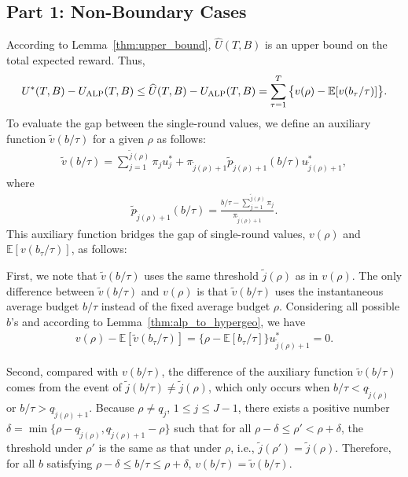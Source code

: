 \subsection{Part 1: Non-Boundary Cases}\label{app:proof_alp_regret_non_boundary}
According to Lemma~\ref{thm:upper_bound}, $\widehat{U}(T,B)$ is an upper bound on the total expected reward. Thus,
\begin{eqnarray} \label{eq:alp_regret}
U^*(T,B) - U_{\rm ALP}(T,B)
\leq  \widehat{U}(T,B) - U_{\rm ALP}(T,B) =  \sum_{\tau = 1}^T \big\{{v}(\rho)-\mathbb{E}[{v}(b_\tau/\tau)]\big\}.
\end{eqnarray}
To evaluate the gap between the single-round values, we define an auxiliary function $\tilde{v}(b/\tau)$ for a given $\rho$ as follows:
\begin{eqnarray}\label{eq:approx_single_round_alp}
\tilde{v}(b/\tau) = \sum_{j = 1}^{\tilde{j}(\rho) }\pi_j u_j^*
 +\pi_{\tilde{j}(\rho) + 1} \tilde{p}_{\tilde{j}(\rho) + 1}(b/\tau) u_{\tilde{j}(\rho) + 1}^*,
\end{eqnarray}
where
\begin{eqnarray}
\tilde{p}_{\tilde{j}(\rho) + 1}(b/\tau) = \frac{b/\tau - \sum_{j = 1}^{\tilde{j}(\rho)} \pi_j} {\pi_{\tilde{j}(\rho) +1}}. \nonumber
\end{eqnarray}
This auxiliary function bridges the gap of single-round values, $v(\rho)$ and $\mathbb{E}[v(b_\tau/\tau)]$, as follows:

First, we note that $\tilde{v}(b/\tau)$ uses the same threshold $\tilde{j}(\rho)$ as in $v(\rho)$.
The only difference between $\tilde{v}(b/\tau)$ and $v(\rho)$ is that $\tilde{v}(b/\tau)$ uses the instantaneous
average budget $b/\tau$ instead of the fixed average budget $\rho$. Considering all possible $b$'s and according to Lemma~\ref{thm:alp_to_hypergeo},
we have
\begin{eqnarray}\label{eq:virtual_and_upperbound}
{v}(\rho) - \mathbb{E}[{\tilde{v}}(b_{\tau}/\tau)] = \big\{\rho - \mathbb{E}[b_{\tau}/\tau]\big\}u_{\tilde{j}(\rho) + 1}^* = 0.
\end{eqnarray}

Second, compared with $v(b/\tau)$, the difference of the auxiliary function $\tilde{v}(b/\tau)$ comes
from the event of $\tilde{j}(b/\tau) \neq \tilde{j}(\rho)$, which only occurs when $b/\tau < q_{\tilde{j}(\rho)}$
or $b/\tau > q_{\tilde{j}(\rho)+1}$.
Because $\rho \neq q_j$, $1 \leq j \leq J-1$,  there exists a positive number $\delta = \min\{\rho -q_{\tilde{j}(\rho)}, q_{\tilde{j}(\rho)+1} - \rho\}$
 such that  for all $\rho - \delta \leq \rho' < \rho + \delta$, the threshold under $\rho'$ is the same as that under $\rho$, i.e.,
$
\tilde{j}(\rho') = \tilde{j}(\rho). \nonumber
$
Therefore, for all $b$ satisfying $\rho - \delta \leq b/\tau \leq \rho + \delta$,
$v(b/\tau) = \tilde{v}(b/\tau)$.

